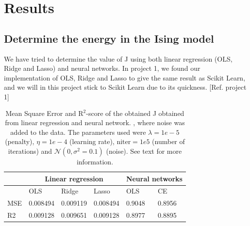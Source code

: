 \section{Results} \label{sec:results}

\subsection{Determine the energy in the Ising model}
We have tried to determine the value of J using both linear regression (OLS, Ridge and Lasso) and neural networks. In project 1, we found our implementation of OLS, Ridge and Lasso to give the same result as Scikit Learn, and we will in this project stick to Scikit Learn due to its quickness. [Ref. project 1]
\begin{table} [H]
	\caption{Mean Square Error and R$^2$-score of the obtained J obtained from linear regression and neural network.  , where noise was added to the data. The parameters used were $\lambda=1e-5$ (penalty), $\eta=1e-4$ (learning rate), $\text{niter}=1e5$ (number of iterations) and $\mathcal{N}(0, \sigma^2=0.1)$ (noise). See text for more information.}
	\begin{tabularx}{\textwidth}{l|XXX|XX} \hline\hline
		\label{tab:franke_error}
		& \multicolumn{3}{c}{\textbf{Linear regression}}&\multicolumn{2}{c}{\textbf{Neural networks}}\\ \hline
		&OLS&Ridge&Lasso&OLS&CE\\ \hline
		MSE & 0.008494 & 0.009119 & 0.008494 & 0.9048 & 0.8956 \\
		R2 & 0.009128 & 0.009651 & 0.009128 & 0.8977 & 0.8895 \\ \hline
	\end{tabularx}
\end{table}

